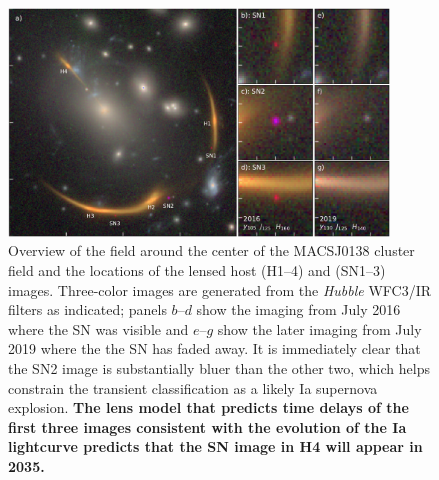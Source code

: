\documentclass[fleqn,10pt]{wlscirep}
\begin{document}
\begin{figure}
    \centering
    \includegraphics[width=0.9\textwidth]{../Figures/fig1_layout.pdf}
    \caption{Overview of the field around the center of the MACSJ0138 cluster field and the locations of the lensed host (H1--4) and \SNABC (SN1--3) images. 
    Three-color images are generated from the \textit{Hubble} WFC3/IR filters as indicated; panels $b$--$d$ show the imaging from July 2016 where the SN was visible and $e$--$g$ show the later imaging from July 2019 where the the SN has faded away.  It is immediately clear that the SN2 image is substantially bluer than the other two, which helps constrain the transient classification as a likely Ia supernova explosion.  \textbf{The lens model that predicts time delays of the first three images consistent with the evolution of the Ia lightcurve predicts that the SN image in H4 will appear in 2035.} }
    \label{fig:layout}
\end{figure}
\end{document}
